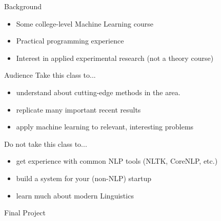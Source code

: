 \documentclass{beamer}
\begin{document}
\begin{frame}{Background}
  \begin{itemize}
  \item Some college-level Machine Learning course
  \item Practical programming experience
  \item Interest in applied experimental research (not a theory course)
  \end{itemize}
\end{frame}

\begin{frame}{Audience}
  Take this class to...
  \begin{itemize}
  \item understand about cutting-edge methods in the area. 
  \item replicate many important recent results 
  \item apply machine learning to relevant, interesting problems
  \end{itemize}
  \pause 

  Do not take this class to...
  \begin{itemize}
  \item get experience with common NLP tools (NLTK, CoreNLP, etc.)
  \item build a system for your (non-NLP) startup
  \item learn much about modern Linguistics
  \end{itemize}
\end{frame}


\begin{frame}{Final Project}
  
\end{frame}
\end{document}
